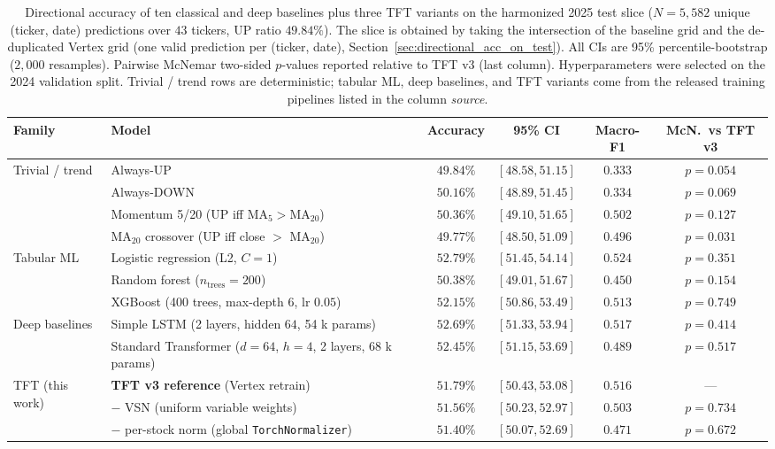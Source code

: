 \documentclass[conference]{IEEEtran}
\begin{document}
\begin{table}[htbp]
\centering
\caption{Directional accuracy of ten classical and deep baselines plus three TFT variants on the harmonized 2025 test slice ($N=5{,}582$ unique (ticker, date) predictions over $43$ tickers, UP ratio $49.84\%$). The slice is obtained by taking the intersection of the baseline grid and the de-duplicated Vertex grid (one valid prediction per (ticker, date), Section~\ref{sec:directional_acc_on_test}). All CIs are 95\% percentile-bootstrap ($2{,}000$ resamples). Pairwise McNemar two-sided $p$-values reported relative to TFT v3 (last column). Hyperparameters were selected on the 2024 validation split. Trivial / trend rows are deterministic; tabular ML, deep baselines, and TFT variants come from the released training pipelines listed in the column \textit{source}.}
\label{tab:baselines}
\small
\setlength{\tabcolsep}{4pt}
\begin{tabular}{llcccc}
\toprule
\textbf{Family} & \textbf{Model} & \textbf{Accuracy} & \textbf{95\% CI} & \textbf{Macro-F1} & \textbf{McN.\ vs TFT v3} \\
\midrule
\multirow{4}{*}{Trivial / trend}
& Always-UP                                       & $49.84\%$ & $[48.58, 51.15]$ & $0.333$ & $p = 0.054$ \\
& Always-DOWN                                     & $50.16\%$ & $[48.89, 51.45]$ & $0.334$ & $p = 0.069$ \\
& Momentum 5/20 (UP iff MA$_5\!>\!\text{MA}_{20}$) & $50.36\%$ & $[49.10, 51.65]$ & $0.502$ & $p = 0.127$ \\
& MA$_{20}$ crossover (UP iff close $>\!$ MA$_{20}$) & $49.77\%$ & $[48.50, 51.09]$ & $0.496$ & $p = 0.031$ \\
\midrule
\multirow{3}{*}{Tabular ML}
& Logistic regression (L2, $C{=}1$)              & $52.79\%$ & $[51.45, 54.14]$ & $\mathbf{0.524}$ & $p = 0.351$ \\
& Random forest ($n_{\mathrm{trees}}{=}200$)     & $50.38\%$ & $[49.01, 51.67]$ & $0.450$ & $p = 0.154$ \\
& XGBoost (400 trees, max-depth $6$, lr $0.05$)  & $52.15\%$ & $[50.86, 53.49]$ & $0.513$ & $p = 0.749$ \\
\midrule
\multirow{2}{*}{Deep baselines}
& Simple LSTM (2 layers, hidden $64$, 54 k params)              & $52.69\%$ & $[51.33, 53.94]$ & $0.517$ & $p = 0.414$ \\
& Standard Transformer ($d{=}64$, $h{=}4$, 2 layers, 68 k params) & $52.45\%$ & $[51.15, 53.69]$ & $0.489$ & $p = 0.517$ \\
\midrule
\multirow{3}{*}{TFT (this work)}
& \textbf{TFT v3 reference} (Vertex retrain)     & $\mathbf{51.79\%}$ & $[50.43, 53.08]$ & $0.516$ & --- \\
& \quad $-$ VSN (uniform variable weights)        & $51.56\%$ & $[50.23, 52.97]$ & $0.503$ & $p = 0.734$ \\
& \quad $-$ per-stock norm (global \texttt{TorchNormalizer}) & $51.40\%$ & $[50.07, 52.69]$ & $0.471$ & $p = 0.672$ \\
\bottomrule
\end{tabular}
\normalsize
\end{table}
\end{document}
